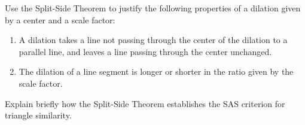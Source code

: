\documentclass[nooutcomes]{ximera}
\begin{document}
\begin{problem}
Use the Split-Side Theorem to justify the following properties of a dilation given by a center and a scale factor:
\begin{enumerate}
\item A dilation takes a line not passing through the center of the dilation to a parallel line, and leaves a line passing through the center unchanged.
\item The dilation of a line segment is longer or shorter in the ratio given by the scale factor.
\end{enumerate}

\end{problem}

\begin{problem}
Explain briefly how the Split-Side Theorem establishes the SAS criterion for triangle similarity.  
\end{problem}
\end{document}
